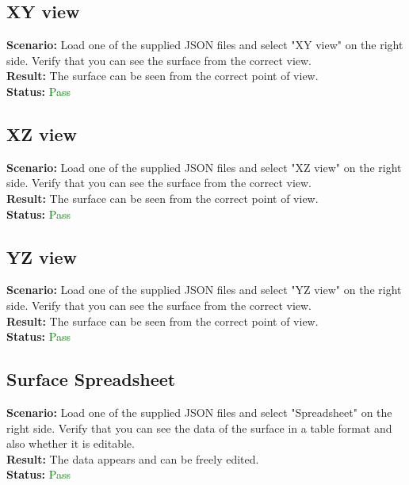 \documentclass[a4paper, 11pt, article]{report}
\begin{document}
\subsection{XY view}

\noindent \textbf{Scenario:} Load one of the supplied JSON files and select "XY view" on the right side. Verify that you can see the surface from the correct view.
\\
\noindent \textbf{Result:} The surface can be seen from the correct point of view.
\\
\noindent \textbf{Status:} \textcolor{green}{Pass}

\subsection{XZ view}

\noindent \textbf{Scenario:} Load one of the supplied JSON files and select "XZ view" on the right side. Verify that you can see the surface from the correct view.
\\
\noindent \textbf{Result:} The surface can be seen from the correct point of view.
\\
\noindent \textbf{Status:} \textcolor{green}{Pass}

\subsection{YZ view}

\noindent \textbf{Scenario:} Load one of the supplied JSON files and select "YZ view" on the right side. Verify that you can see the surface from the correct view.
\\
\noindent \textbf{Result:} The surface can be seen from the correct point of view.
\\
\noindent \textbf{Status:} \textcolor{green}{Pass}

\subsection{Surface Spreadsheet}

\noindent \textbf{Scenario:} Load one of the supplied JSON files and select "Spreadsheet" on the right side. Verify that you can see the data of the surface in a table format and also whether it is editable.
\\
\noindent \textbf{Result:} The data appears and can be freely edited.
\\
\noindent \textbf{Status:} \textcolor{green}{Pass}
\end{document}
